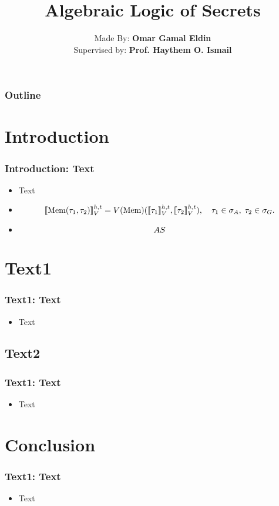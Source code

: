 \documentclass[aspectratio=169]{beamer}
\title{\Huge Algebraic Logic of Secrets}
\author{Made By: \textbf{Omar Gamal Eldin}\\Supervised by: \textbf{Prof. Haythem O. Ismail}}
\institute{}
\date{}
\let\mathcal\relax
\let\mathfrak\relax
\begin{document}
\frame{\titlepage}


\begin{frame}
\frametitle{Outline}
\small
\tableofcontents
\end{frame}


\section{Introduction}

\begin{frame}
\frametitle{Introduction: Text}
\begin{itemize}
    \item Text
    \item {\thesisserif
      \[
        \llbracket \text{Mem}(\tau_1, \tau_2) \rrbracket_{\mathcal{V}}^{h,t}
        = \mathcal{V}(\text{Mem})
        (\llbracket \tau_1 \rrbracket_{\mathcal{V}}^{h,t}, 
        \llbracket \tau_2 \rrbracket_{\mathcal{V}}^{h,t}),
        \quad \tau_1 \in \sigma_A, \; \tau_2 \in \sigma_G.
      \]
    }
    \item \[\mathfrak{AS}\]
\end{itemize}
\end{frame}


\section{Text1}
\begin{frame}
\frametitle{Text1: Text}
\begin{itemize}
    \item Text
\end{itemize}
\end{frame}

\subsection{Text2}

\begin{frame}
\frametitle{Text1: Text}
\begin{itemize}
    \item Text
\end{itemize}
\end{frame}



\section{Conclusion}

\begin{frame}
\frametitle{Text1: Text}
\begin{itemize}
    \item Text
\end{itemize}
\end{frame}

\end{document}
